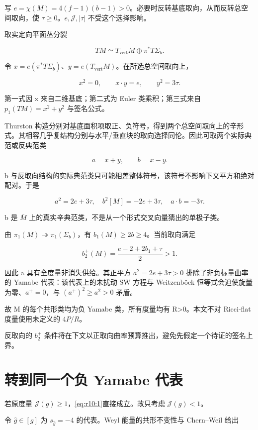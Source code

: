 \documentclass[UTF8,11pt,openany,oneside,fontset=none]{ctexbook}
\begin{document}
写 \(e=\chi(M)=4(f-1)(b-1)>0\)。必要时反转基底取向，从而反转总空间取向，使 \(\tau\ge0\)。\(e,\mathcal J,|\tau|\) 不受这个选择影响。

取实定向平面丛分裂

\[
TM\simeq T_{\mathrm{vert}}M\oplus\pi^*T\Sigma_b.
\]

令 \(x=e(\pi^*T\Sigma_b)\)、\(y=e(T_{\mathrm{vert}}M)\)。在所选总空间取向上，

\[
x^2=0,\qquad x\cdot y=e,\qquad y^2=3\tau.
\tag{10.4}\label{eq:r10:4}
\]

第一式因 x 来自二维基底；第二式为 Euler 类乘积；第三式来自 \(p_1(TM)=x^2+y^2\) 与签名公式。

Thurston 构造分别对基底面积项取正、负符号，得到两个总空间取向上的辛形式。其相容几乎复结构分别与水平/垂直块的取向选择同伦。因此可取两个实际典范或反典范类

\[
a=x+y,\qquad b=x-y.
\]

b 与反取向结构的实际典范类只可能相差整体符号，该符号不影响下文平方和绝对配对。于是

\[
\boxed{
 a^2=2e+3\tau,\quad b^2[M]=-2e+3\tau,
 \quad a\cdot b=-3\tau.
}
\tag{10.5}\label{eq:r10:5}
\]

b 是 \(\bar M\) 上的真实辛典范类，不是从一个形式交叉向量猜出的单极子类。

由 \(\pi_1(M)\twoheadrightarrow\pi_1(\Sigma_b)\)，有 \(b_1(M)\ge2b\ge4\)。当前取向满足

\[
b_2^+(M)=\frac{e-2+2b_1+\tau}{2}>1.
\]

因此 a 具有全度量非消失供给。其正平方 \(a^2=2e+3\tau>0\) 排除了非负标量曲率的 Yamabe 代表：该代表上的未扰动 SW 方程与 Weitzenböck 恒等式会迫使旋量为零、\(a^+=0\)，与 \((a^+)^2\ge a^2>0\) 矛盾。

故 M 的每个共形类均为负 Yamabe 类，所有度量均有 R\textgreater0。本文不对 Ricci-flat 度量使用未定义的 \(4P/R\)。

反取向的 \(b_2^+\) 条件将在下文以正取向曲率预算推出，避免先假定一个待证的签名上界。

\section{转到同一个负 Yamabe 代表}\label{ch10:ux8f6cux5230ux540cux4e00ux4e2aux8d1f-yamabe-ux4ee3ux8868}

若原度量 \(\mathcal J(g)\ge1\)，\eqref{eq:r10:1}直接成立。故只考虑 \(\mathcal J(g)<1\)。

令 \(\hat g\in[g]\) 为 \(s_{\hat g}=-4\) 的代表。Weyl 能量的共形不变性与 Chern--Weil 给出
\end{document}

